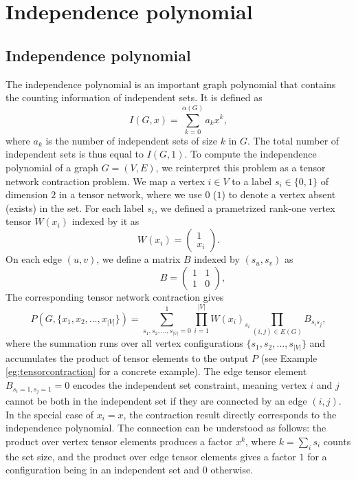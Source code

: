\documentclass[onefignum, onetabnum]{siamart190516}
\newcommand{\<}{\langle}
\renewcommand{\>}{\rangle}
\newcounter{example}
\begin{document}
\section{Independence polynomial}
\subsection{Independence polynomial}\label{sec:indpoly}
The independence polynomial is an important graph polynomial that contains the counting information of independent sets. It is defined as
\begin{equation}
I(G, x) = \sum_{k=0}^{\alpha(G)} a_k x^k,
\end{equation}
where $a_k$ is the number of independent sets of size $k$ in $G$. The total number of independent sets is thus equal to $I(G, 1)$.
To compute the independence polynomial of a graph $G = (V, E)$, we reinterpret this problem as a tensor network contraction problem.
We map a vertex $i\in V$ to a label $s_i \in \{0, 1\}$ of dimension $2$ in a tensor network, where we use $0$ ($1$) to denote a vertex absent (exists) in the set.
For each label $s_i$, we defined a prametrized rank-one vertex tensor $W(x_i)$ indexed by it as
\begin{equation}
    W(x_i) = \left(\begin{matrix}
        1 \\
        x_i
    \end{matrix}\right).
\end{equation}
On each edge $(u, v)$, we define a matrix $B$ indexed by $(s_u, s_v)$ as
\begin{equation}
    \qquad \quad 
       B = \left(\begin{matrix}
        1  & 1\\
        1 & 0
    \end{matrix}\right), \label{eq:tensor}
\end{equation}
The corresponding tensor network contraction gives
\begin{equation}\label{eq:idp}
    P(G, \{x_1, x_{2}, \ldots,x_{|V|}\}) = \sum\limits_{s_1, s_2, \ldots, s_{|V|} = 0}^{1} \prod\limits_{i=1}^{|V|} W(x_i)_{s_i} \prod\limits_{(i,j) \in E(G)} B_{s_i s_j},
\end{equation}
where the summation runs over all vertex configurations $\{s_1, s_{2}, \ldots,s_{|V|}\}$ and accumulates the product of tensor elements to the output $P$ (see Example \ref{eg:tensorcontraction} for a concrete example).
The edge tensor element $B_{s_{i}=1, s_{j}=1} = 0$ encodes the independent set constraint, meaning vertex $i$ and $j$ cannot be both in the independent set if they are connected by an edge $(i,j)$.
In the special case of $x_i = x$, the contraction result directly corresponds to the independence polynomial.
The connection can be understood as follows: the product over vertex tensor elements produces a factor $x^k$, where $k=\sum_i s_i$ counts the set size,
and the product over edge tensor elements gives a factor $1$ for a configuration being in an independent set and $0$ otherwise.
\end{document}
